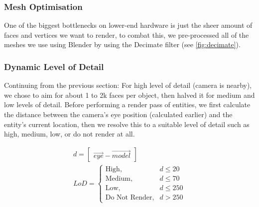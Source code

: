 \documentclass{article}
\begin{document}
\begin{multicols}{2}
                \subsubsection{Mesh Optimisation}

                    One of the biggest bottlenecks on lower-end hardware is just the sheer amount of faces and vertices we want to render, to combat this, we pre-processed all of the meshes we use using Blender by using the Decimate filter (see \autoref{fig:decimate}).

                \subsubsection{Dynamic Level of Detail}

                    Continuing from the previous section: For high level of detail (camera is nearby), we chose to aim for about 1 to 2k faces per object, then halved it for medium and low levels of detail. Before performing a render pass of entities, we first calculate the distance between the camera’s eye position (calculated earlier) and the entity’s current location, then we resolve this to a suitable level of detail such as high, medium, low, or do not render at all.

                    \[
                        \begin{array}{l}
                            d = \begin{bmatrix}
                                \vec{eye} - \vec{model}
                            \end{bmatrix} \\
                            LoD = \begin{cases}
                                \text{High}, &d \leq 20 \\
                                \text{Medium}, &d \leq 70 \\
                                \text{Low}, &d \leq 250 \\
                                \text{Do Not Render}, &d > 250
                            \end{cases}
                        \end{array}
                    \]


        

\end{multicols}
\end{document}
